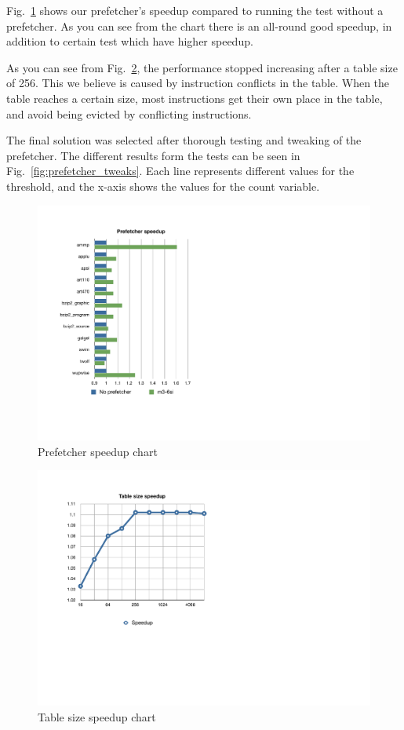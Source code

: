 Fig.~\ref{fig:prefetcher_speedup} shows our prefetcher's speedup compared to running the test without a prefetcher. As you can see from the chart there is an all-round good speedup, in addition to certain test which have higher speedup.

As you can see from Fig.~\ref{fig:table_size_chart}, the performance stopped increasing after a table size of 256. This we believe is caused by instruction conflicts in the table. When the table reaches a certain size, most instructions get their own place in the table, and avoid being evicted by conflicting instructions.

The final solution was selected after thorough testing and tweaking of the prefetcher. The different results form the tests can be seen in Fig.~\ref{fig:prefetcher_tweaks}. Each line represents different values for the threshold, and the x-axis shows the values for the count variable.

\begin{figure}
	\centering \includegraphics[scale=0.7]{img/prefetcher_chart.pdf}
	\caption{Prefetcher speedup chart}
	\label{fig:prefetcher_speedup}
\end{figure}

\begin{figure}
	\centering \includegraphics[scale=0.7]{img/table_size_chart.pdf}
	\caption{Table size speedup chart}
	\label{fig:table_size_chart}
\end{figure}

